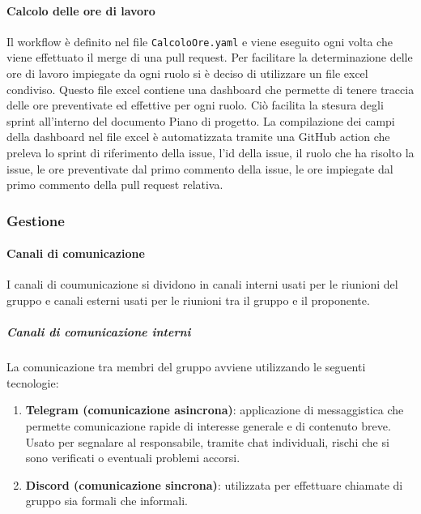 \paragraph{Calcolo delle ore di lavoro}
\label{par:calcolo_ore_lavoro}
Il workflow è definito nel file \texttt{CalcoloOre.yaml} e viene eseguito ogni volta che viene effettuato il merge di una pull request.
Per facilitare la determinazione delle ore di lavoro impiegate da ogni ruolo si è deciso di utilizzare un file excel condiviso.
Questo file excel contiene una dashboard che permette di tenere traccia delle ore preventivate ed effettive per ogni ruolo.
Ciò facilita la stesura degli sprint all'interno del documento Piano di progetto.
La compilazione dei campi della dashboard nel file excel è automatizzata tramite una GitHub action che preleva lo sprint di riferimento della issue,
l'id della issue, il ruolo che ha risolto la issue, le ore preventivate dal primo commento della issue, le ore impiegate dal primo commento della pull request relativa.

\subsubsection{Gestione}
\paragraph{Canali di comunicazione}
I canali di coumunicazione si dividono in canali interni usati per le riunioni del gruppo e canali esterni usati per le riunioni tra il gruppo e il proponente.

\subparagraph{Canali di comunicazione interni}
\label{subpar:canali_interni}
La comunicazione tra membri del gruppo avviene utilizzando le seguenti tecnologie:
\begin{enumerate}
    \item \textbf{Telegram (comunicazione asincrona)}: applicazione di messaggistica che permette comunicazione rapide di interesse generale e di contenuto breve.
    Usato per segnalare al responsabile, tramite chat individuali, rischi che si sono verificati o eventuali problemi accorsi.

    \item \textbf{Discord (comunicazione sincrona)}: utilizzata per effettuare chiamate di gruppo sia formali che informali.
\end{enumerate}

